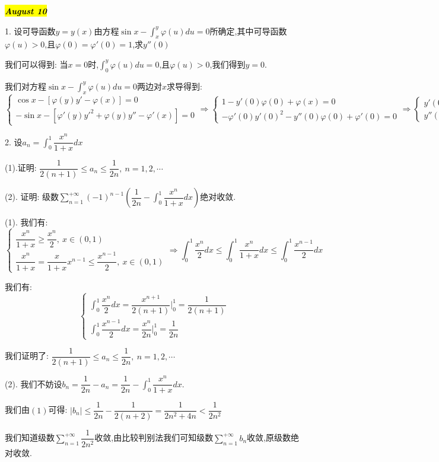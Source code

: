 \hl{\textbf{\textit{August 10}}}

1. 设可导函数$y=y(x)$由方程$\sin x-\int_{x}^{y}\varphi(u)du=0$所确定,其中可导函数$\varphi(u)>0$,且$\varphi(0)=\varphi'(0)=1$,求$y''(0)$
\begin{solution}

	我们可以得到:  当$x=0$时,$\int_{0}^{y}\varphi(u)du=0$,且$\varphi(u)>0$,我们得到$y=0$.
	
	我们对方程$\sin x-\int_{x}^{y}\varphi(u)du=0$两边对$x$求导得到:  
	$$\left\lbrace
	\begin{array}{l}
		\cos x-[\varphi(y)y'-\varphi(x)]=0\\
		-\sin x-[\varphi'(y)y'^2+\varphi(y)y''-\varphi'(x)]=0
	\end{array}
	\right. \Rightarrow \left\lbrace
	\begin{array}{l}
		1-y'(0)\varphi(0)+\varphi(x)=0\\
		-\varphi'(0)y'(0)^2-y''(0)\varphi(0)+\varphi'(0)=0
	\end{array}
	\right. \Rightarrow \left\lbrace
	\begin{array}{l}
		y'(0)=2\\
		y''(0)=-3
	\end{array}
	\right. $$
\end{solution}

2. 设$a_{n}=\int_{0}^{1}\dfrac{x^n}{1+x}dx$

(1).证明:  $\dfrac{1}{2(n+1)}\leq a_{n}\leq \dfrac{1}{2n},\ n=1,2,\cdots$

(2). 证明:  级数$\sum\limits_{n=1}^{+\infty}(-1)^{n-1}(\dfrac{1}{2n}-\int_{0}^{1}\dfrac{x^n}{1+x}dx)$绝对收敛.
\begin{solution}

	(1). 我们有:  $$\left\lbrace
	\begin{array}{l}
		\dfrac{x^n}{1+x}\geq \dfrac{x^n}{2},\ x\in(0,1)\\
		\dfrac{x^n}{1+x}=\dfrac{x}{1+x}x^{n-1}\leq\dfrac{x^{n-1}}{2},\ x\in(0,1)
	\end{array}
	\right. \Rightarrow \int_{0}^{1}\dfrac{x^n}{2}dx\leq \int_{0}^{1}\dfrac{x^n}{1+x}dx\leq \int_{0}^{1}\dfrac{x^{n-1}}{2}dx$$
	
	我们有:  $$\left\lbrace
	\begin{array}{l}
		\int_{0}^{1}\dfrac{x^n}{2}dx=\dfrac{x^{n+1}}{2(n+1)}|_{0}^{1}=\dfrac{1}{2(n+1)}\\
		\int_{0}^{1}\dfrac{x^{n-1}}{2}dx=\dfrac{x^{n}}{2n}|_{0}^{1}=\dfrac{1}{2n}
	\end{array}
	\right. $$
	
	我们证明了:  $\dfrac{1}{2(n+1)}\leq a_{n}\leq \dfrac{1}{2n},\ n=1,2,\cdots$
	
	(2). 我们不妨设$b_{n}=\dfrac{1}{2n}-a_{n}=\dfrac{1}{2n}-\int_{0}^{1}\dfrac{x^n}{1+x}dx$.
	
	我们由$(1)$可得:  $|b_{n}|\leq \dfrac{1}{2n}-\dfrac{1}{2(n+2)}=\dfrac{1}{2n^2+4n}<\dfrac{1}{2n^2}$
	
	我们知道级数$\sum\limits_{n=1}^{+\infty}\dfrac{1}{2n^2}$收敛,由比较判别法我们可知级数$\sum\limits_{n=1}^{+\infty}b_{n}$收敛,原级数绝对收敛.
\end{solution}

